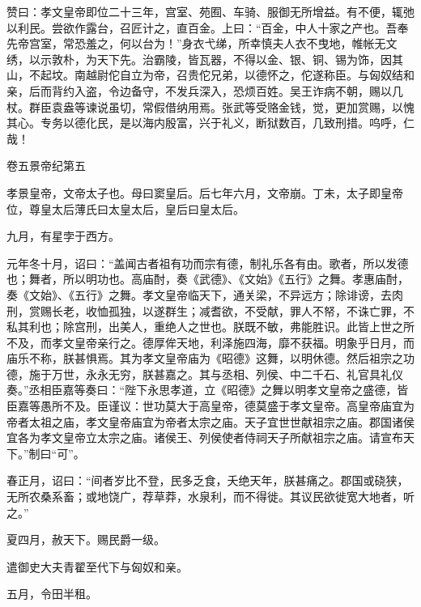 \documentclass[12pt,UTF8]{ctexbook}
\begin{document}
赞曰：孝文皇帝即位二十三年，宫室、苑囿、车骑、服御无所增益。有不便，辄弛以利民。尝欲作露台，召匠计之，直百金。上曰：“百金，中人十家之产也。吾奉先帝宫室，常恐羞之，何以台为！”身衣弋绨，所幸慎夫人衣不曳地，帷帐无文绣，以示敦朴，为天下先。治霸陵，皆瓦器，不得以金、银、铜、锡为饰，因其山，不起坟。南越尉佗自立为帝，召贵佗兄弟，以德怀之，佗遂称臣。与匈奴结和亲，后而背约入盗，令边备守，不发兵深入，恐烦百姓。吴王诈病不朝，赐以几杖。群臣袁盎等谏说虽切，常假借纳用焉。张武等受赂金钱，觉，更加赏赐，以愧其心。专务以德化民，是以海内殷富，兴于礼义，断狱数百，几致刑措。呜呼，仁哉！





卷五景帝纪第五



孝景皇帝，文帝太子也。母曰窦皇后。后七年六月，文帝崩。丁未，太子即皇帝位，尊皇太后薄氏曰太皇太后，皇后曰皇太后。



九月，有星孛于西方。



元年冬十月，诏曰：“盖闻古者祖有功而宗有德，制礼乐各有由。歌者，所以发德也；舞者，所以明功也。高庙酎，奏《武德》、《文始》《五行》之舞。孝惠庙酎，奏《文始》、《五行》之舞。孝文皇帝临天下，通关梁，不异远方；除诽谤，去肉刑，赏赐长老，收恤孤独，以遂群生；减耆欲，不受献，罪人不帑，不诛亡罪，不私其利也；除宫刑，出美人，重绝人之世也。朕既不敏，弗能胜识。此皆上世之所不及，而孝文皇帝亲行之。德厚侔天地，利泽施四海，靡不获福。明象乎日月，而庙乐不称，朕甚惧焉。其为孝文皇帝庙为《昭德》这舞，以明休德。然后祖宗之功德，施于万世，永永无穷，朕甚嘉之。其与丞相、列侯、中二千石、礼官具礼仪奏。”丞相臣嘉等奏曰：“陛下永思孝道，立《昭德》之舞以明孝文皇帝之盛德，皆臣嘉等愚所不及。臣谨议：世功莫大于高皇帝，德莫盛于孝文皇帝。高皇帝庙宜为帝者太祖之庙，孝文皇帝庙宜为帝者太宗之庙。天子宜世世献祖宗之庙。郡国诸侯宜各为孝文皇帝立太宗之庙。诸侯王、列侯使者侍祠天子所献祖宗之庙。请宣布天下。”制曰“可”。



春正月，诏曰：“间者岁比不登，民多乏食，夭绝天年，朕甚痛之。郡国或硗狭，无所农桑系畜；或地饶广，荐草莽，水泉利，而不得徙。其议民欲徙宽大地者，听之。”



夏四月，赦天下。赐民爵一级。



遣御史大夫青翟至代下与匈奴和亲。



五月，令田半租。
\end{document}
